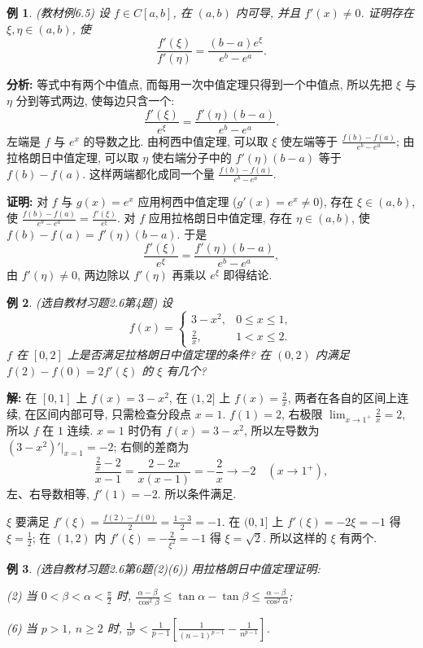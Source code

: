 \documentclass[UTF8,openany]{ctexbook}
\theoremstyle{chinesetextbook}
\newtheorem{example}{例}[section]
\newenvironment{cnproof}{\par\indent\textbf{证明:} \ignorespaces}{\par}
\newenvironment{cnsolution}{\par\indent\textbf{解:} \ignorespaces}{\par}
\begin{document}
\begin{example}\label{ex:c2-6-5}
\textnormal{(教材例6.5)} 设 $f\in C[a,b]$, 在 $(a,b)$ 内可导, 并且 $f'(x)\ne0$. 证明存在 $\xi,\eta\in(a,b)$, 使
\[
\frac{f'(\xi)}{f'(\eta)}=\frac{(b-a)e^\xi}{e^b-e^a}.
\]
\end{example}
\par\indent\textbf{分析:} 等式中有两个中值点, 而每用一次中值定理只得到一个中值点, 所以先把 $\xi$ 与 $\eta$ 分到等式两边, 使每边只含一个:
\[
\frac{f'(\xi)}{e^\xi}=\frac{f'(\eta)(b-a)}{e^b-e^a}.
\]
左端是 $f$ 与 $e^x$ 的导数之比. 由柯西中值定理, 可以取 $\xi$ 使左端等于 $\displaystyle\frac{f(b)-f(a)}{e^b-e^a}$; 由拉格朗日中值定理, 可以取 $\eta$ 使右端分子中的 $f'(\eta)(b-a)$ 等于 $f(b)-f(a)$. 这样两端都化成同一个量 $\displaystyle\frac{f(b)-f(a)}{e^b-e^a}$.
\begin{cnproof}
对 $f$ 与 $g(x)=e^x$ 应用柯西中值定理 ($g'(x)=e^x\ne0$), 存在 $\xi\in(a,b)$, 使 $\displaystyle\frac{f(b)-f(a)}{e^b-e^a}=\frac{f'(\xi)}{e^\xi}$. 对 $f$ 应用拉格朗日中值定理, 存在 $\eta\in(a,b)$, 使 $f(b)-f(a)=f'(\eta)(b-a)$. 于是
\[
\frac{f'(\xi)}{e^\xi}=\frac{f'(\eta)(b-a)}{e^b-e^a},
\]
由 $f'(\eta)\ne0$, 两边除以 $f'(\eta)$ 再乘以 $e^\xi$ 即得结论.
\end{cnproof}
\begin{example}\label{ex:c2-h6-4}
\textnormal{(选自教材习题2.6第4题)} 设
\[
f(x)=\begin{cases}3-x^2,&0\le x\le1,\\\frac2x,&1<x\le2.\end{cases}
\]
$f$ 在 $[0,2]$ 上是否满足拉格朗日中值定理的条件? 在 $(0,2)$ 内满足 $f(2)-f(0)=2f'(\xi)$ 的 $\xi$ 有几个?
\end{example}
\begin{cnsolution}
在 $[0,1]$ 上 $f(x)=3-x^2$, 在 $(1,2]$ 上 $\displaystyle f(x)=\frac2x$, 两者在各自的区间上连续, 在区间内部可导, 只需检查分段点 $x=1$. $f(1)=2$, 右极限 $\displaystyle\lim_{x\to1^+}\frac2x=2$, 所以 $f$ 在 $1$ 连续. $x=1$ 时仍有 $f(x)=3-x^2$, 所以左导数为 $(3-x^2)'\big|_{x=1}=-2$; 右侧的差商为
\[
\frac{\frac2x-2}{x-1}=\frac{2-2x}{x(x-1)}=-\frac2x\to-2\quad(x\to1^+),
\]
左、右导数相等, $f'(1)=-2$. 所以条件满足.

$\xi$ 要满足 $\displaystyle f'(\xi)=\frac{f(2)-f(0)}2=\frac{1-3}2=-1$. 在 $(0,1]$ 上 $f'(\xi)=-2\xi=-1$ 得 $\displaystyle\xi=\frac12$; 在 $(1,2)$ 内 $\displaystyle f'(\xi)=-\frac2{\xi^2}=-1$ 得 $\xi=\sqrt2$. 所以这样的 $\xi$ 有两个.
\end{cnsolution}
\begin{example}\label{ex:c2-h6-6}
\textnormal{(选自教材习题2.6第6题(2)(6))} 用拉格朗日中值定理证明:

(2) 当 $\displaystyle0<\beta<\alpha<\frac\pi2$ 时, $\displaystyle\frac{\alpha-\beta}{\cos^2\beta}\le\tan\alpha-\tan\beta\le\frac{\alpha-\beta}{\cos^2\alpha}$;

(6) 当 $p>1$, $n\ge2$ 时, $\displaystyle\frac1{n^p}<\frac1{p-1}\left[\frac1{(n-1)^{p-1}}-\frac1{n^{p-1}}\right]$.
\end{example}
\end{document}

